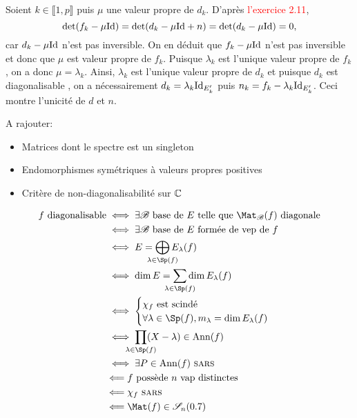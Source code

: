 \begin{solution}
    Soient $k \in \llbracket 1, p \rrbracket$ puis $\mu$ une valeur propre de $d_k$. D'après \textcolor{red}{l'exercice 2.11}, 
    $$\det(f_k - \mu \mathrm{Id}) = \det(d_k - \mu \mathrm{Id} + n) = \det(d_k - \mu \mathrm{Id}) = 0,$$
    car $d_k - \mu \mathrm{Id}$ n'est pas inversible. On en déduit que $f_k - \mu \mathrm{Id}$ n'est pas inversible et donc que $\mu$ est valeur propre de $f_k$. Puisque $\lambda_k$ est l'unique valeur propre de $f_k$, on a donc $\mu = \lambda_k$. Ainsi, $\lambda_k$ est l'unique valeur propre de $d_k$ et puisque $d_k$ est diagonalisable \note {}, on a nécessairement $d_k = \lambda_k \mathrm{Id}_{E'_k}$ puis $n_k = f_k - \lambda_k \mathrm{Id}_{E'_k}$. Ceci montre l'unicité de $d$ et $n$.
\end{solution}

A rajouter:
\begin{itemize}
    \item Matrices dont le spectre est un singleton
    \item Endomorphismes symétriques à valeurs propres positives
    \item Critère de non-diagonalisabilité sur $\mathbb{C}$
\end{itemize}

\newpage

\begin{figure*}
    \begin{Large}
    \begin{align*}
        f \text{ diagonalisable} &\iff \exists \mathscr{B} \text{ base de } E \text{ telle que } \Mat_\mathscr{B}(f) \text{ diagonale} \\
        &\iff \exists \mathscr{B} \text{ base de } E \text{ formée de vep de } f\\
        &\iff E = \smashoperator{\bigoplus_{\lambda \in \Sp(f)}} E_\lambda(f) \\
        &\iff \dim E = \smashoperator{\sum_{\lambda \in \Sp(f)}} \dim E_\lambda(f) \\
        &\iff 
        \begin{cases}
        \chi_f \text{ est scindé} \\
        \forall \lambda \in \Sp(f), m_{\lambda} = \dim E_\lambda(f)
        \end{cases} \\
        &\iff \smashoperator{\prod_{\lambda \in \Sp(f)}}(X-\lambda) \in \mathrm{Ann}(f)\\
        &\iff \exists P \in \mathrm{Ann}(f) \text{ \textsc{sars}} \\
        &\Longleftarrow f \text{ possède } n \text{ vap distinctes} \\
        &\Longleftarrow \chi_f \text{ \textsc{sars}}\\
        &\Longleftarrow \Mat(f) \in \mathscr{S}_n(\R)
    \end{align*}
    \end{Large}
\end{figure*}

\begin{figure*}[h!]
    
\end{figure*}